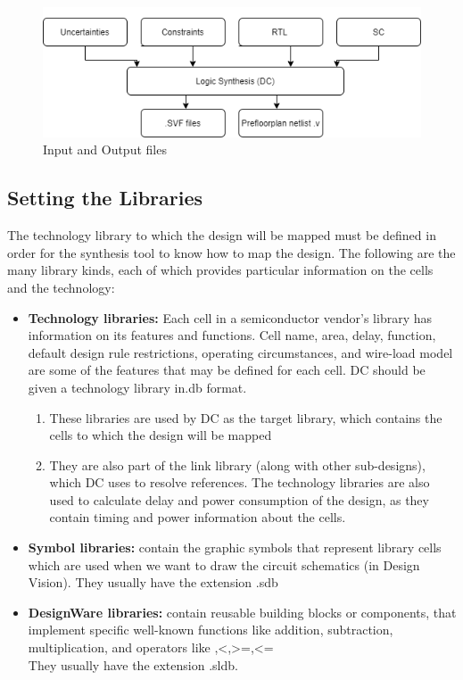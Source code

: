 \documentclass[../main.tex]{subfiles}
\begin{document}
   \begin{figure}[t]
\centering
\includegraphics[scale = 0.8]{diagrams/ip_op_syn.png}
\caption{Input and Output files}
\label{fig:ip_op_syn}
\end{figure}
    \subsection{Setting the Libraries}
The technology library to which the design will be mapped must be defined in order for the synthesis tool to know how to map the design. The following are the many library kinds, each of which provides particular information on the cells and the technology:
\begin{itemize}
\item \textbf{Technology libraries:} Each cell in a semiconductor vendor's library has information on its features and functions. Cell name, area, delay, function, default design rule restrictions, operating circumstances, and wire-load model are some of the features that may be defined for each cell. DC should be given a technology library in.db format.
\begin{enumerate}
\item These libraries are used 
by DC as the target library, which contains the cells to which the design will be mapped
\item  They are 
also part of the link library (along with other sub-designs), which DC uses to resolve references. 
The technology libraries are also used to calculate delay and power consumption of the design, as 
they contain timing and power information about the cells.
\end{enumerate}
\item  \textbf{Symbol libraries:} contain the graphic symbols that represent library cells which are used when we want to draw the circuit schematics (in Design Vision). They usually have the extension .sdb
\item \textbf{DesignWare libraries:} contain reusable building blocks or components, that implement specific 
well-known functions like addition, subtraction, multiplication, and operators like 
\>,<,>=,<=
\\ They usually have the extension .sldb.

\end{itemize}
\end{document}
